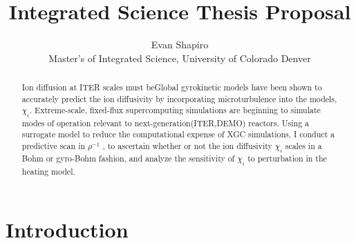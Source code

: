 \documentclass{article}
\title{Integrated Science Thesis Proposal}
\author{Evan Shapiro \\ Master's of Integrated Science, University of Colorado Denver}
\begin{document}
\begin{abstract}
Ion diffusion at ITER scales must beGlobal gyrokinetic models have been shown to accurately predict the ion diffusivity by incorporating microturbulence into the models, $\chi_i$.
Extreme-scale, fixed-flux supercomputing simulations are beginning
to simulate modes of operation relevant to next-generation(ITER,DEMO)
reactors. Using a surrogate model to reduce the computational expense of XGC simulations, I conduct a predictive scan
in $\rho^{-1}$ , to ascertain
whether or not the ion diffusivity $\chi_i$ scales in a Bohm or gyro-Bohm
fashion, and analyze the sensitivity of $\chi_i$ to perturbation in the heating
model.%
\end{abstract}

\maketitle
\tableofcontents




\section{Introduction}
\end{document}
